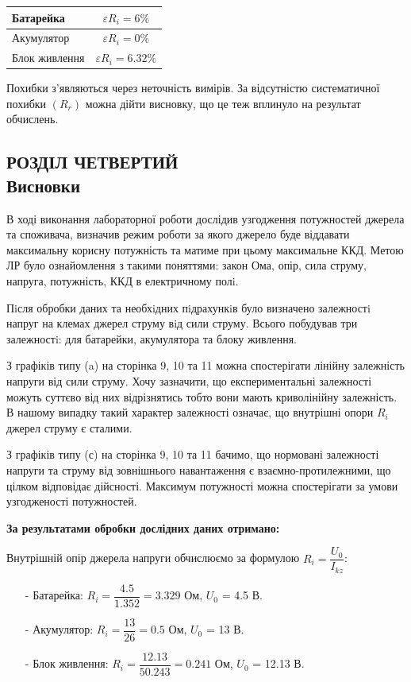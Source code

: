 \documentclass[a4paper,12pt]{article}
\newcommand{\ri}{R_i}
\newcommand{\uo}{U_0}
\newcommand{\ik}{I_{kz}}
\begin{document}
	\begin{table}[h!]
		\centering
		\begin{tabular}{|l|c|}
			\hline
			Батарейка     & $\varepsilon\ri=6\%$ \\ \hline
			Акумулятор    & $\varepsilon\ri=0\%$  \\ \hline
			Блок живлення & $\varepsilon\ri=6.32\%$ \\ \hline
		\end{tabular}
	\end{table}
	Похибки з'являються через неточність вимірів. За відсутністю систематичної похибки $(R_r)$ можна дійти висновку, що це теж вплинуло на результат обчислень.
	
\newpage
	\begin{center}
		\section* {РОЗДІЛ ЧЕТВЕРТИЙ\\Висновки}
	\end{center}
	В ході виконання лабораторної роботи дослідив узгодження потужностей джерела та споживача, визначив режим роботи за якого джерело буде віддавати максимальну корисну потужність та матиме при цьому максимальне ККД. Метою ЛР було ознайомлення з такими поняттями: закон Ома, опір, сила струму, напруга, потужність, ККД в електричному полi. 
	
	Пiсля обробки даних та необхiдних пiдрахункiв було визначено залежностi напруг на клемах джерел струму вiд сили струму. Всього побудував три залежностi: для батарейки, акумулятора та блоку живлення.
	
	З графіків типу (a) на сторінка 9, 10 та 11 можна спостерігати лінійну залежність напруги від сили струму. Хочу зазначити, що експериментальні залежності можуть суттєво від них відрізнятись тобто вони мають криволінійну залежність. В нашому випадку такий характер залежності означає, що внутрішні опори $\ri$ джерел струму є сталими. 
	
	З графіків типу (с) на сторінка 9, 10 та 11 бачимо, що нормовані залежності напруги та струму від зовнішнього навантаження є взаємно-протилежними, що цілком відповідає дійсності. Максимум потужності можна спостерігати за умови узгодженості потужностей. \\
	
	\begin{center}
		\textbf{За результатами обробки дослідних даних отримано:}
	\end{center}
	Внутрішній опір джерела напруги обчислюємо за формулою $\ri=\dfrac{\uo}{\ik}$:
	\begin{enumerate}
		\item[-] Батарейка: $\ri=\dfrac{4.5}{1.352}=3.329$ Ом, $\uo$ = 4.5 В.
		\item[-] Акумулятор: $\ri=\dfrac{13}{26}=0.5$ Ом, $\uo$ = 13 В.
		\item[-] Блок живлення: $\ri=\dfrac{12.13}{50.243}=0.241$ Ом, $\uo$ = 12.13 В.
	\end{enumerate}
\end{document}

